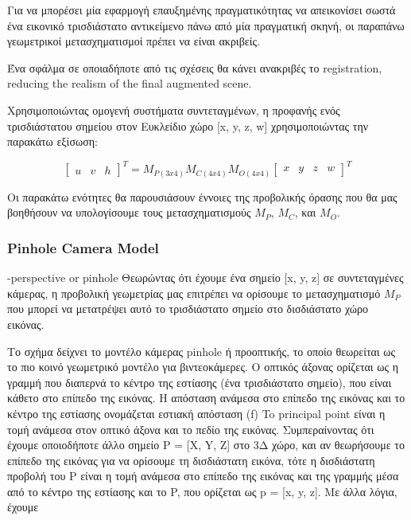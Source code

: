 Για να μπορέσει μία εφαρμογή επαυξημένης πραγματικότητας να απεικονίσει σωστά ένα εικονικό τρισδιάστατο αντικείμενο πάνω από μία πραγματική σκηνή, οι παραπάνω γεωμετρικοί μετασχηματισμοί πρέπει να είναι ακριβείς.

Ένα σφάλμα σε οποιαδήποτε από τις σχέσεις θα κάνει ανακριβές το registration, reducing the realism of the final augmented scene.

Χρησιμοποιώντας ομογενή συστήματα συντεταγμένων, η προφανής ενός τρισδιάστατου σημείου στον Ευκλείδιο χώρο [x, y, z, w] χρησιμοποιώντας την παρακάτω εξίσωση:

\begin{equation}
\begin{bmatrix}
u & v & h
\end{bmatrix}
^{T}=
M_{P(3x4)}M_{C(4x4)}M_{O(4x4)}
\begin{bmatrix}
x & y & z & w
\end{bmatrix}
^{T}
\end{equation}

Οι παρακάτω ενότητες θα παρουσιάσουν έννοιες της προβολικής όρασης που θα μας βοηθήσουν να υπολογίσουμε τους μετασχηματισμούς 
$M_{P}$, $M_{C}$, και $M_{O}$.




\subsubsection{Pinhole Camera Model}


-perspective or pinhole
Θεωρώντας ότι έχουμε ένα σημείο [x, y, z] σε συντεταγμένες κάμερας, η προβολική γεωμετρίας μας επιτρέπει να ορίσουμε το μετασχηματισμό $M_{P}$ που μπορεί να μετατρέψει αυτό το τρισδιάστατο σημείο στο δισδιάστατο χώρο εικόνας.



Το σχήμα δείχνει το μοντέλο κάμερας pinhole ή προοπτικής, το οποίο θεωρείται ως το πιο κοινό γεωμετρικό μοντέλο για βιντεοκάμερες. Ο οπτικός άξονας ορίζεται ως η γραμμή που διαπερνά το κέντρο της εστίασης (ένα τρισδιάστατο σημείο), που είναι κάθετο στο επίπεδο της εικόνας. Η απόσταση ανάμεσα στο επίπεδο της εικόνας και το κέντρο της εστίασης ονομάζεται εστιακή απόσταση (f)
To principal point είναι η τομή ανάμεσα στον οπτικό άξονα και το πεδίο της εικόνας. Συμπεραίνοντας ότι έχουμε οποιοδήποτε άλλο σημείο P = [X, Y, Z] στο 3Δ χώρο, και αν θεωρήσουμε το επίπεδο της εικόνας για να ορίσουμε τη δισδιάστατη εικόνα, τότε η δισδιάστατη προβολή του P είναι η τομή ανάμεσα στο επίπεδο της εικόνας και της γραμμής μέσα από το κέντρο της εστίασης και το P, που ορίζεται ως p = [x, y, z]. Με άλλα λόγια, έχουμε 

